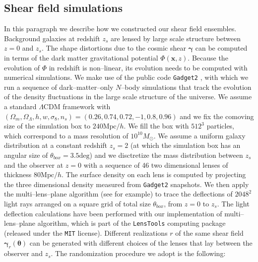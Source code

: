 \documentclass[reprint,aps,prd,superscriptaddress,showkeys,showpacs]{revtex4-1}
\newcommand{\bb}[1]{\mathbf{#1}}
\begin{document}
\subsection{Shear field simulations}
\label{shearsim}
%
In this paragraph we describe how we constructed our shear field ensembles. Background galaxies at redshift $z_s$ are lensed by large scale structure between $z=0$ and $z_s$. The shape distortions due to the cosmic shear $\pmb{\gamma}$ can be computed in terms of the dark matter gravitational potential $\Phi(\bb{x},z)$. Because the evolution of $\Phi$ in redshift is non--linear, its evolution needs to be computed with numerical simulations. We make use of the public code \texttt{Gadget2} \citep{Gadget2}, with which we run a sequence of dark--matter--only $N$--body simulations that track the evolution of the density fluctuations in the large scale structure of the universe. We assume a standard $\Lambda$CDM framework with $(\Omega_m,\Omega_\Lambda,h,w,\sigma_8,n_s)=(0.26,0.74,0.72,-1,0.8,0.96)$ and we fix the comoving size of the simulation box to $240\mathrm{Mpc}/h$. We fill the box with $512^3$ particles, which correspond to a mass resolution of $10^{10}M_\odot$. We assume a uniform galaxy distribution at a constant redshift $z_s=2$ (at which the simulation box has an angular size of $\theta_{box}=3.5\mathrm{deg}$) and we disctretize the mass distribution between $z_s$ and the observer at $z=0$ with a sequence of 46 two dimensional lenses of thickness $80\mathrm{Mpc}/h$. The surface density on each lens is computed by projecting the three dimensional density measured from \texttt{Gadget2} snapshots. We then apply the multi--lens--plane algorithm (see \citep{RayTracingHartlap,RayTracingJain} for example) to trace the deflections of $2048^2$ light rays arranged on a square grid of total size $\theta_{box}$, from $z=0$ to $z_s$. The light deflection calculations have been performed with our implementation of multi--lens--plane algorithm, which is part of the \texttt{LensTools} computing package \citep{LensTools} (released under the \texttt{MIT} license). Different realizations $r$ of the same shear field $\pmb{\gamma}_r(\pmb{\theta})$ can be generated with different choices of the lenses that lay between the observer and $z_s$. The randomization procedure we adopt is the following:
\end{document}
